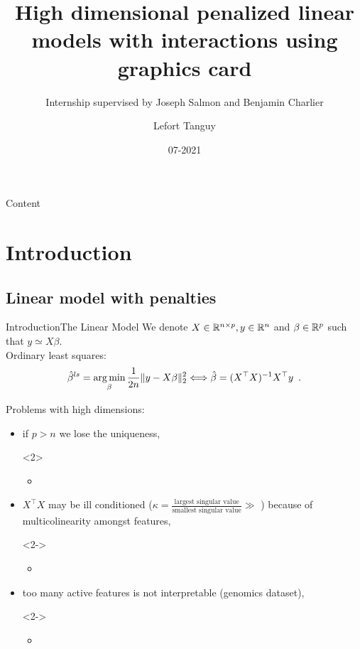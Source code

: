 \documentclass[10pt,aspectratio=43]{beamer}
\title[] %
{High dimensional penalized linear models with interactions using graphics card
} %
\subtitle{Internship supervised by Joseph Salmon and Benjamin Charlier}
\date{07-2021} %
\author[]%
{%
	{Lefort Tanguy}%
}
\institute[
]
{%
    University of Montpellier
}
\begin{document}
\maketitle


\begin{frame}{Content}{}
    \tableofcontents
\end{frame}

\section{Introduction}

\subsection{Linear model with penalties}
\begin{frame}{Introduction}{The Linear Model}
We denote $X \in \mathbb{R}^{n \times p}, y \in \mathbb{R}^n$ and
$\beta \in \mathbb{R}^p$ such that $y\simeq X\beta$. \\
Ordinary least squares:
\[\hat\beta^{ls} = \mathop{\mathrm{arg\,min}}_{\beta} \frac{1}{2n}\|y-X\beta\|_2^2
\Longleftrightarrow \hat \beta = (X^\top X)^{-1}X^\top y \enspace.\]

Problems with high dimensions:
\begin{itemize}
\item if $p>n$ we lose the uniqueness,
\begin{onlyenv}<2>
    \begin{itemize}
        \item  \color{red}{make the problem strictly convex.}
    \end{itemize}
\end{onlyenv}
\item $X^\top X$ may be ill conditioned
($\kappa = \frac{\text{largest singular value}}{
    \text{smallest singular value}} \gg $ )
    because of multicolinearity amongst features,
\begin{onlyenv}<2->
    \begin{itemize}
        \item \color{red}{Shift spectrum by a small quantity using
        $\ell_2$ penalty.}
    \end{itemize}
\end{onlyenv}
\item too many active features is not interpretable (genomics dataset),
\begin{onlyenv}<2->
    \begin{itemize}
        \item \color{red}{Feature selection using $\ell_1$ penalty.}
    \end{itemize}
\end{onlyenv}\end{itemize}
\end{frame}
\end{document}
